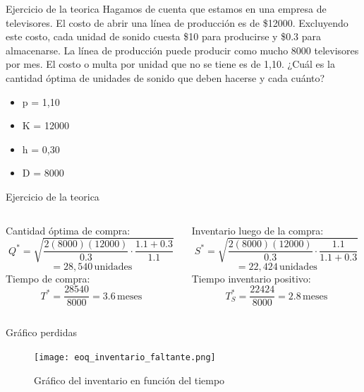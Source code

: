 \documentclass{beamer}
\begin{document}
\begin{frame}{Ejercicio de la teorica}
Hagamos de cuenta que estamos en una empresa de televisores. El costo de abrir una línea de producción es de \$12000. Excluyendo este costo, cada unidad de sonido cuesta \$10 para producirse y \$0.3 para almacenarse. La línea de producción puede producir como mucho 8000 televisores por mes. El costo o multa por unidad que no se tiene es de 1,10. ¿Cuál es la cantidad óptima de unidades de sonido que deben hacerse y cada cuánto?
    \begin{itemize}
            \item p = 1,10
            \item K = 12000
            \item h = 0,30
            \item D = 8000
        \end{itemize}
\end{frame}

\begin{frame}{Ejercicio de la teorica}
    
    \begin{columns}[T]
        \begin{column}{0.5\textwidth}
            \textcolor{primary}{Cantidad óptima de compra:}
            \[ Q^* = \sqrt{\frac{2(8000)(12000)}{0.3} \cdot \frac{1.1+0.3}{1.1}}  \]
            \[= 28,540\,\text{unidades}\]
            \vspace{0.5cm}
            \textcolor{primary}{Tiempo de compra:}
            \[T^* = \frac{28540}{8000}= 3.6 \,\text{meses}\]
        \end{column}
        \begin{column}{0.5\textwidth}
            \textcolor{primary}{Inventario luego de la compra:}
            \[ S^* = \sqrt{\frac{2(8000)(12000)}{0.3} \cdot \frac{1.1}{1.1+0.3}}  \]
            \[= 22,424\,\text{unidades}\]
            \vspace{0.5cm}
            \textcolor{primary}{Tiempo inventario positivo:}
            \[T_S^* = \frac{22424}{8000} = 2.8 \,\text{meses}\]
        \end{column}
    \end{columns}
\end{frame}

\begin{frame}{Gráfico perdidas}
    \begin{figure}
        \centering
        \texttt{[image: eoq\_inventario\_faltante.png]}
        \caption{Gráfico del inventario en función del tiempo}
    \end{figure}
\end{frame}
\end{document}

